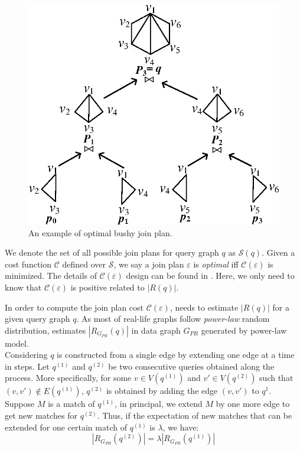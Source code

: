 \begin{figure}[htb]
  \centering
  \includegraphics[scale=0.6]{figures/tree.eps}
  \caption{\small{An example of optimal bushy join plan.}}
  \label{fig:tree}
\end{figure}

We denote the set of all possible join plans for query graph $q$ as $\mathcal{S}(q)$. Given a cost function $\mathcal{C}$ defined over $\mathcal{S}$, we say a join plan $\varepsilon$ is \textit{optimal} iff $\mathcal{C}(\varepsilon)$ is minimized. The details of $\mathcal{C}(\varepsilon)$ design can be found in \cite{Lai2016}. Here, we only need to know that $\mathcal{C}(\varepsilon)$ is positive related to $|R(q)|$.

 In order to compute the join plan cost  $\mathcal{C}(\varepsilon)$, \cliquejoin needs to estimate $|R(q)|$ for a given query graph $q$. As most of real-life graphs follow \textit{power-law} random distribution\cite{Chung2003}, \cliquejoin estimates $|R_{G_{PR}}(q)|$ in data graph $G_{PR}$ generated by power-law model.\\

Considering $q$ is constructed from a single edge by extending one edge at a time in steps. Let $q^{(1)}$ and $q^{(2)}$ be two consecutive queries obtained along the process. More specifically, for some $v\in V(q^{(1)})$ and $v'\in V(q^{(2)})$ such that  $(v,v')\not\in E(q^{(1)})$, $q^{(2)}$ is obtained by adding the edge $(v,v')$ to $q^{1}$. Suppose $M$ is a match of $q^{(1)}$, in principal, we extend $M$ by one more edge to get new matches for $q^{(2)}$. Thus, if the expectation of new matches that can be extended for one certain match of $q^{(1)}$ is $\lambda$, we have:
\begin{equation} \label{eq:r}
|R_{G_{PR}}(q^{(2)})|=\lambda |R_{G_{PR}}(q^{(1)})|
\end{equation}

